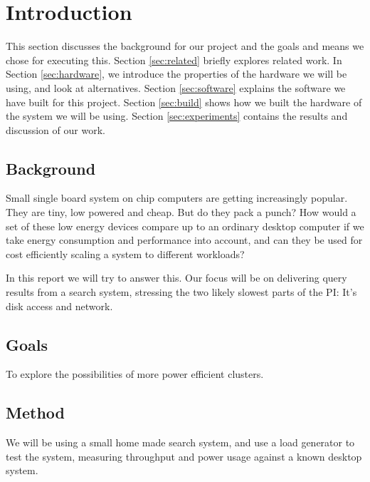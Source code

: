 \clearpage

\section{Introduction}
\label{sec:introduction}
This section discusses the background for our project and the goals and means we chose for executing this.
Section \ref{sec:related} briefly explores related work.
In Section \ref{sec:hardware}, we introduce the properties of the hardware we will be using, and look at alternatives.
Section \ref{sec:software} explains the software we have built for this project.
Section \ref{sec:build} shows how we built the hardware of the system we will be using.
Section \ref{sec:experiments} contains the results and discussion of our work.

\subsection{Background}
Small single board system on chip computers are getting increasingly popular. They are tiny, low powered and cheap. But do they pack a punch?
How would a set of these low energy devices compare up to an ordinary desktop computer if we take energy consumption and performance into account, and can they be used for cost efficiently scaling a system to different workloads?

In this report we will try to answer this. Our focus will be on delivering query results from a search system, stressing the two likely slowest parts of the PI:
It's disk access and network.

\subsection{Goals}
To explore the possibilities of more power efficient clusters.

\subsection{Method}
We will be using a small home made search system, and use a load generator to test the system, measuring throughput and power usage against a known desktop system.


